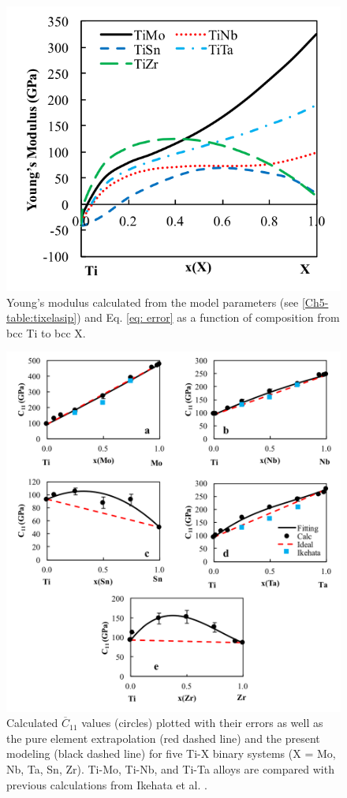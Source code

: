 \pagebreak
\begin{figure}[H]
	\centering
	\includegraphics{Chapter-5/Figures/emap.png}
	\caption{Young's modulus calculated from the model parameters (see \ref{Ch5-table:tixelasip}) and Eq. \ref{eq: error} as a function of composition from bcc Ti to bcc X.}
	\label{Ch5-figure:tixmap}
\end{figure}

\pagebreak
\begin{figure}[H]
	\centering
	\includegraphics[width=\textwidth]{Chapter-5/Figures/tixc11.png}
	\caption{Calculated $\overline{C}_{11}$ values (circles) plotted with their errors as well as the pure element extrapolation (red dashed line) and the present modeling (black dashed line) for five Ti-X binary systems (X = Mo, Nb, Ta, Sn, Zr). Ti-Mo, Ti-Nb, and Ti-Ta alloys are compared with previous calculations from Ikehata et al. \cite{Ikehata2004}.}
	\label{Ch5-figure:tixc11}
\end{figure}

